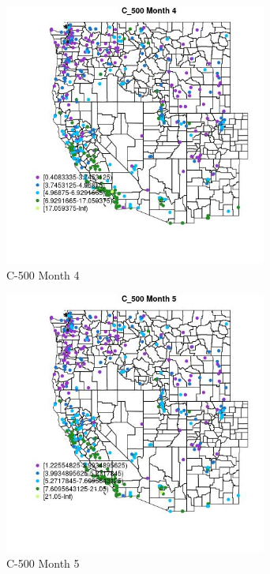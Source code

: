 \clearpage 

\begin{figure} 
\centering  
\includegraphics[width=0.77\textwidth]{Code_Outputs/ML_input_report_ML_input_PM25_Step5_part_d_de_duplicated_aves_ML_input_MapObsMo4C_500.jpg} 
\caption{\label{fig:ML_input_report_ML_input_PM25_Step5_part_d_de_duplicated_aves_ML_inputMapObsMo4C_500}C-500 Month 4} 
\end{figure} 
 

\begin{figure} 
\centering  
\includegraphics[width=0.77\textwidth]{Code_Outputs/ML_input_report_ML_input_PM25_Step5_part_d_de_duplicated_aves_ML_input_MapObsMo5C_500.jpg} 
\caption{\label{fig:ML_input_report_ML_input_PM25_Step5_part_d_de_duplicated_aves_ML_inputMapObsMo5C_500}C-500 Month 5} 
\end{figure} 
 

